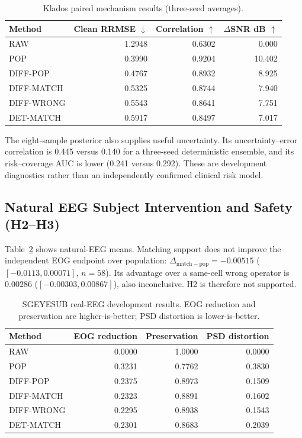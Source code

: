 \begin{table}[t]
\caption{Klados paired mechanism results (three-seed averages).}
\label{tab:klados_results}
\centering
\begin{tabular}{lrrr}
\toprule
Method & Clean RRMSE $\downarrow$ & Correlation $\uparrow$ & $\Delta$SNR dB $\uparrow$\\
\midrule
RAW & 1.2948 & 0.6302 & 0.000\\
POP & 0.3990 & 0.9204 & 10.402\\
DIFF-POP & 0.4767 & 0.8932 & 8.925\\
DIFF-MATCH & 0.5325 & 0.8744 & 7.940\\
DIFF-WRONG & 0.5543 & 0.8641 & 7.751\\
DET-MATCH & 0.5917 & 0.8497 & 7.017\\
\bottomrule
\end{tabular}
\end{table}

The eight-sample posterior also supplies useful uncertainty.  Its
uncertainty--error correlation is 0.445 versus 0.140 for a three-seed
deterministic ensemble, and its risk--coverage AUC is lower (0.241 versus
0.292).  These are development diagnostics rather than an independently
confirmed clinical risk model.

\subsection{Natural EEG Subject Intervention and Safety (H2--H3)}
Table~\ref{tab:sge_results} shows natural-EEG means.  Matching support does not
improve the independent EOG endpoint over population:
$\Delta_{\mathrm{match-pop}}=-0.00515$
($[-0.0113,0.00071]$, $n=58$).  Its advantage over a same-cell wrong operator is
$0.00286$ ($[-0.00303,0.00867]$), also inconclusive.  H2 is therefore not
supported.

\begin{table}[t]
\caption{SGEYESUB real-EEG development results.  EOG reduction and preservation
are higher-is-better; PSD distortion is lower-is-better.}
\label{tab:sge_results}
\centering
\begin{tabular}{lrrr}
\toprule
Method & EOG reduction & Preservation & PSD distortion\\
\midrule
RAW & 0.0000 & 1.0000 & 0.0000\\
POP & 0.3231 & 0.7762 & 0.3830\\
DIFF-POP & 0.2375 & 0.8973 & 0.1509\\
DIFF-MATCH & 0.2323 & 0.8891 & 0.1602\\
DIFF-WRONG & 0.2295 & 0.8938 & 0.1543\\
DET-MATCH & 0.2301 & 0.8683 & 0.2039\\
\bottomrule
\end{tabular}
\end{table}

